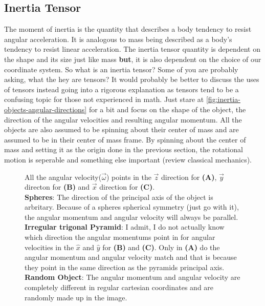 \documentclass[11pt,a4paper]{book}
\newcommand{\imginput}[1]{} %
\begin{document}
		\subsection{Inertia Tensor}
			\label{subsec:Inertia Tensor}
			The moment of inertia is the quantity that describes a body tendency to resist angular acceleration. It is analogous to mass being described as a body's tendency to resist linear acceleration. The inertia tensor quantity is dependent on the shape and its size just like mass \textbf{but}, it is also dependent on the choice of our coordinate system. So what is an inertia tensor? Some of you are probably asking, what the hey are tensors? It would probably be better to discuss the uses of tensors instead going into a rigorous explanation as tensors tend to be a confusing topic for those not experienced in math. Just stare at \autoref{fig:inertia-objects-angular-directions} for a bit and focus on the shape of the object, the direction of the angular velocities and resulting angular momentum. All the objects are also assumed to be spinning about their center of mass and are assumed to be in their center of mass frame. By spinning about the center of mass and setting it as the origin done in the previous section, the rotational motion is seperable and something else important (review classical mechanics).
			
			\begin{figure} [!ht]
				\centering
				\large
				\def\svgwidth{\columnwidth}
				\resizebox{14cm}{!}{\imginput{images/inertia-objects-angular-directions.pdf_tex}}
				\caption{All the angular velocity($\vec{\omega}$) points in the $\vec{z}$ direction for \textbf{(A)}, $\vec{y}$ directon for \textbf{(B)} and $\vec{x}$ direction for \textbf{(C)}.\\
				\textbf{Spheres}: The direction of the principal axis of the object is arbritary. Because of a spheres spherical symmetry (just go with it), the angular momentum and angular velocity will always be parallel.\\
				\textbf{Irregular trigonal Pyramid}: I admit, I do not actually know which direction the angular momentums point in for angular velocities in the $\hat{x}$ and $\hat{y}$ for \textbf{(B)} and \textbf{(C)}. Only in \textbf{(A)} do the angular momentum and angular velocity match and that is because they point in the same direction as the pyramids principal axis.\\
				\textbf{Random Object}: The angular momentum and angular velocity are completely different in regular cartesian coordinates and are randomly made up in the image.
				}
				\label{fig:inertia-objects-angular-directions}
			\end{figure}
				
\end{document}
